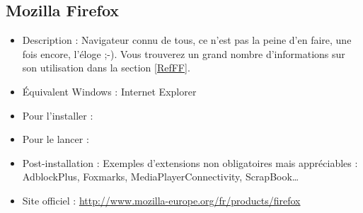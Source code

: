 \subsection{Mozilla Firefox}
\begin{itemize}
\begingroup
{}
\item Description : Navigateur connu de tous, ce n'est pas la peine d'en faire, une fois encore, l'éloge ;-). Vous trouverez un grand nombre d'informations sur son utilisation dans la section \ref{RefFF}.{\par}
\endgroup
\item Équivalent Windows : Internet Explorer{\par}
\item Pour l'installer : 
\item Pour le lancer : 
\item Post-installation : Exemples d'extensions non obligatoires mais appréciables : AdblockPlus, Foxmarks, MediaPlayerConnectivity, ScrapBook\ldots{}{\par}
\item Site officiel : \url{http://www.mozilla-europe.org/fr/products/firefox}{\par}
\end{itemize}
